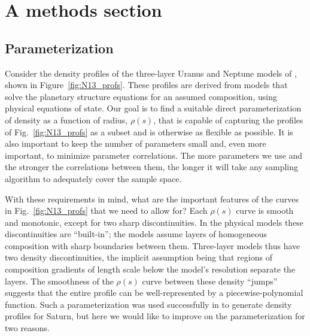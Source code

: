 
\section{A methods section}\label{sec:method}
\subsection{Parameterization}\label{sec:params}

Consider the density profiles of the three-layer Uranus and Neptune models of
\citet{Nettelmann2013b}, shown in Figure~\ref{fig:N13_profs}. These profiles are
derived from models that solve the planetary structure equations for an assumed
composition, using physical equations of state. Our goal is to find a suitable
direct parameterization of density as a function of radius, $\rho(s)$, that is
capable of capturing the profiles of Fig.~\ref{fig:N13_profs} as a subset and is
otherwise as flexible as possible. It is also important to keep the number of
parameters small and, even more important, to minimize parameter correlations.
The more parameters we use and the stronger the correlations between them, the
longer it will take any sampling algorithm to adequately cover the sample space.

With these requirements in mind, what are the important features of the curves
in Fig.~\ref{fig:N13_profs} that we need to allow for? Each $\rho(s)$ curve is
smooth and monotonic, except for two sharp discontinuities. In the physical
models these discontinuities are ``built-in''; the models assume layers of
homogeneous composition with sharp boundaries between them. Three-layer models
thus have two density discontinuities, the implicit assumption being that
regions of composition gradients of length scale below the model's resolution
separate the layers. The smoothness of the $\rho(s)$ curve between these density
``jumps'' suggests that the entire profile can be well-represented by a
piecewise-polynomial function. Such a parameterization was used successfully in
\citep{Movshovitz2020} to generate density profiles for Saturn, but here we
would like to improve on the parameterization for two reasons.